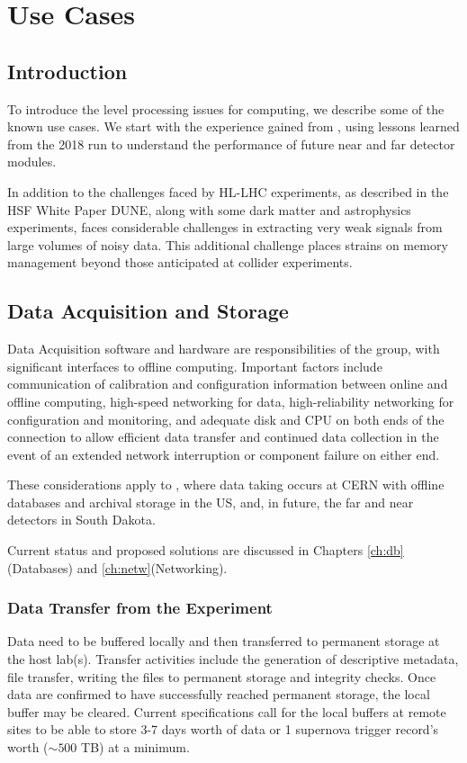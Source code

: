 \documentclass[../main-v1.tex]{subfiles}
\begin{document}
\chapter{Use Cases}
\label{ch:use}
\newcommand{\ignore}[1]{{}}



\section{Introduction}

To introduce the  level processing issues for  computing, we describe some of the known use cases.  We start with  the experience gained from  ,  using lessons learned from the 2018 run to understand the performance of future near and far detector modules. 

In addition to the challenges faced by HL-LHC experiments, as described in the HSF White Paper \cite{HEPSoftwareFoundation:2017ggl} DUNE, along with some dark matter and astrophysics experiments, faces considerable challenges in extracting very weak signals from large volumes of noisy data.  This additional challenge places strains on memory management beyond those anticipated at collider experiments. 

\section{Data Acquisition and Storage}

Data Acquisition software and hardware are responsibilities of the  group, with significant interfaces to offline computing. Important factors include communication of calibration and configuration information between online and offline computing, high-speed networking for data, high-reliability networking for configuration and monitoring, and adequate disk and CPU on both ends of the connection to allow efficient data transfer and continued data collection in the event of an extended network interruption or component failure on either end.

These considerations apply to , where data taking occurs at CERN with offline databases and archival storage in the US,  and, in future, the far and near detectors in South Dakota. 

Current status and proposed solutions are discussed in Chapters \ref{ch:db}(Databases) and \ref{ch:netw}(Networking). 

\subsection{Data Transfer from the Experiment}
Data need to be buffered locally and then transferred to permanent storage at the host lab(s).  Transfer activities include the generation of descriptive metadata, file transfer, writing the files to permanent storage and integrity checks.  Once data are confirmed to have successfully reached permanent storage, the local buffer may be cleared.  Current specifications call for the local buffers at remote sites to be able to store 3-7 days worth of data or 1 supernova trigger record's worth ($\sim 500$ TB) at a minimum. 
\end{document}
